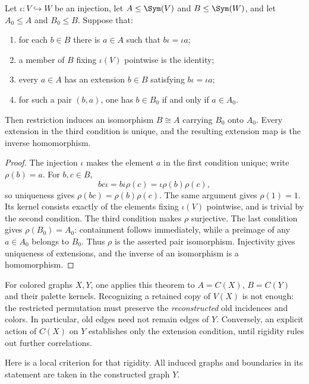 \begin{theorem}\label{UR.Restriction}
Let $\iota:V\hookrightarrow W$ be an injection, let
$A\leq\Sym(V)$ and $B\leq\Sym(W)$, and let $A_0\leq A$ and $B_0\leq B$.
Suppose that:
\begin{enumerate}
\item for each $b\in B$ there is $a\in A$ such that
$b\iota=\iota a$;
\item a member of $B$ fixing $\iota(V)$ pointwise is the identity;
\item every $a\in A$ has an extension $b\in B$ satisfying
$b\iota=\iota a$;
\item for such a pair $(b,a)$, one has $b\in B_0$ if and only if $a\in A_0$.
\end{enumerate}
Then restriction induces an isomorphism $B\cong A$ carrying $B_0$ onto $A_0$.
Every extension in the third condition is unique, and the resulting extension
map is the inverse homomorphism.
\end{theorem}
\begin{proof}
The injection $\iota$ makes the element $a$ in the first condition unique;
write $\rho(b)=a$. For $b,c\in B$,
\[
 bc\iota=b\iota\rho(c)=\iota\rho(b)\rho(c),
\]
so uniqueness gives $\rho(bc)=\rho(b)\rho(c)$. The same argument gives
$\rho(1)=1$. Its kernel consists exactly of the elements fixing $\iota(V)$
pointwise, and is trivial by the second condition. The third condition makes
$\rho$ surjective. The last condition gives
$\rho(B_0)=A_0$: containment follows immediately, while a preimage of any
$a\in A_0$ belongs to $B_0$. Thus $\rho$ is the asserted pair isomorphism.
Injectivity gives uniqueness of extensions, and the inverse of an isomorphism
is a homomorphism.
\end{proof}

For colored graphs $X,Y$, one applies this theorem to $A=C(X)$,
$B=C(Y)$ and their palette kernels. Recognizing a retained copy of $V(X)$
is not enough: the restricted permutation must preserve the \emph{reconstructed}
old incidences and colors. In particular, old edges need not remain edges of
$Y$. Conversely, an explicit action of $C(X)$ on $Y$ establishes only the
extension condition, until rigidity rules out further correlations.

Here is a local criterion for that rigidity. All induced graphs and boundaries
in its statement are taken in the constructed graph $Y$.

